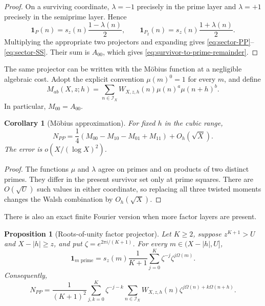 \documentclass[11pt]{article}
\newtheorem{proposition}[theorem]{Proposition}
\newtheorem{corollary}[theorem]{Corollary}
\theoremstyle{definition}
\theoremstyle{remark}
\newcommand{\one}{\mathbf 1}
\newcommand{\cI}{\mathcal I}
\newcommand{\Om}{\Omega}
\begin{document}
\begin{proof}
On a surviving coordinate, $\lambda=-1$ precisely in the prime layer and $\lambda=+1$ precisely in the semiprime layer.  Hence
\[
 \one_P(n)=s_z(n)\frac{1-\lambda(n)}2,
 \qquad
 \one_{P_2}(n)=s_z(n)\frac{1+\lambda(n)}2.
\]
Multiplying the appropriate two projectors and expanding gives \eqref{eq:sector-PP}--\eqref{eq:sector-SS}.  Their sum is $A_{00}$, which gives \eqref{eq:survivor-to-prime-remainder}.
\end{proof}

The same projector can be written with the M\"obius function at a negligible algebraic cost.  Adopt the explicit convention $\mu(m)^0=1$ for every $m$, and define
\begin{equation}\label{eq:mobius-moments}
 M_{ab}(X,z;h)=
 \sum_{n\in\cI_X}W_{X,z,h}(n)
 \mu(n)^a\mu(n+h)^b.
\end{equation}
In particular, $M_{00}=A_{00}$.

\begin{corollary}[M\"obius approximation]\label{cor:mobius-projector}
For fixed $h$ in the cubic range,
\begin{equation}\label{eq:mobius-prime-projector}
 N_{PP}=
 \frac14(M_{00}-M_{10}-M_{01}+M_{11})+O_h(\sqrt X).
\end{equation}
The error is $o(X/(\log X)^2)$.
\end{corollary}

\begin{proof}
The functions $\mu$ and $\lambda$ agree on primes and on products of two distinct primes.  They differ in the present survivor set only at prime squares.  There are $O(\sqrt U)$ such values in either coordinate, so replacing all three twisted moments changes the Walsh combination by $O_h(\sqrt X)$.
\end{proof}

There is also an exact finite Fourier version when more factor layers are present.

\begin{proposition}[Roots-of-unity factor projector]\label{prop:root-unity-projector}
Let $K\ge2$, suppose $z^{K+1}>U$ and $X-|h|\ge z$, and put $\zeta=e^{2\pi i/(K+1)}$.  For every $m\in(X-|h|,U]$,
\begin{equation}\label{eq:root-unity-one-point}
 \one_{m\text{ prime}}
 =s_z(m)\frac1{K+1}
  \sum_{j=0}^{K}\zeta^{-j}\zeta^{j\Om(m)}.
\end{equation}
Consequently,
\begin{equation}\label{eq:root-unity-pair}
 N_{PP}=\frac1{(K+1)^2}
 \sum_{j,k=0}^{K}\zeta^{-j-k}
 \sum_{n\in\cI_X}W_{X,z,h}(n)
 \zeta^{j\Om(n)+k\Om(n+h)}.
\end{equation}
\end{proposition}
\end{document}

